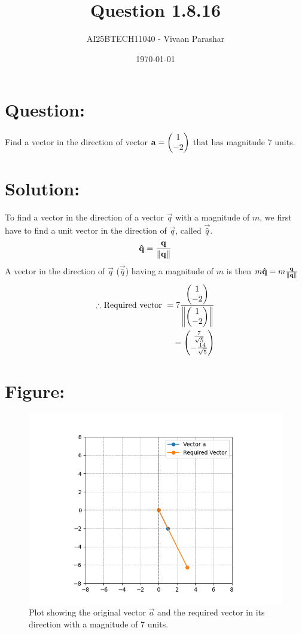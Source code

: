 \documentclass[a4paper, 12pt]{article}
\title{Question 1.8.16}
\author{AI25BTECH11040 - Vivaan Parashar}
\date{\today}
\begin{document}
\maketitle

\section{Question: }
Find a vector in the direction of vector $\mathbf{a} = \begin{pmatrix}1 \\ -2\end{pmatrix}$ that has magnitude 7 units.

\section{Solution: }
To find a vector in the direction of a vector $\vec{q}$ with a magnitude of $m$, we first have to find a unit vector in the direction of $\vec{q}$, called $\vec{\hat{q}}$.
\begin{align}
    \mathbf{\hat{q}} = \frac{\mathbf{q}}{\left\lVert\mathbf{q}\right\rVert}
\end{align}
A vector in the direction of $\vec{q}$ ($\vec{\hat{q}}$) having a magnitude of $m$ is then $m \mathbf{\hat{q}} = m\frac{\mathbf{q}}{\left\lVert\mathbf{q}\right\rVert}$
\begin{align}
    \therefore \text{Required vector } = 7\frac{\begin{pmatrix}1 \\ -2\end{pmatrix}}{\left\lVert\begin{pmatrix}1 \\ -2\end{pmatrix}\right\rVert}\\
    = \begin{pmatrix}\frac{7}{\sqrt{5}}                          \\ - \frac{14}{\sqrt{5}}\end{pmatrix}
\end{align}

\section{Figure:}
\begin{figure}[h]
    \centering
    \includegraphics[width=\columnwidth]{figs/plot.png}
    \caption{Plot showing the original vector $\vec{a}$ and the required vector in its direction with a magnitude of 7 units.}
    \label{fig:plot}
\end{figure}
\end{document}
